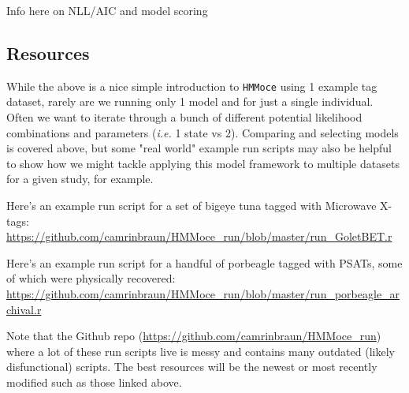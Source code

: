 \documentclass{article}\usepackage[]{graphicx}\usepackage[]{color}
\newcommand{\ie}{\textit{i.e.} }
\begin{document}
Info here on NLL/AIC and model scoring


\subsection{Resources}

While the above is a nice simple introduction to \texttt{HMMoce} using 1 example tag dataset, rarely are we running only 1 model and for just a single individual. Often we want to iterate through a bunch of different potential likelihood combinations and parameters (\ie 1 state vs 2). Comparing and selecting models is covered above, but some "real world" example run scripts may also be helpful to show how we might tackle applying this model framework to multiple datasets for a given study, for example.

Here's an example run script for a set of bigeye tuna tagged with Microwave X-tags:
\url{https://github.com/camrinbraun/HMMoce_run/blob/master/run_GoletBET.r}

Here's an example run script for a handful of porbeagle tagged with PSATs, some of which were physically recovered:
\url{https://github.com/camrinbraun/HMMoce_run/blob/master/run_porbeagle_archival.r}

Note that the Github repo (\url{https://github.com/camrinbraun/HMMoce_run}) where a lot of these run scripts live is messy and contains many outdated (likely disfunctional) scripts. The best resources will be the newest or most recently modified such as those linked above.



\end{document}
